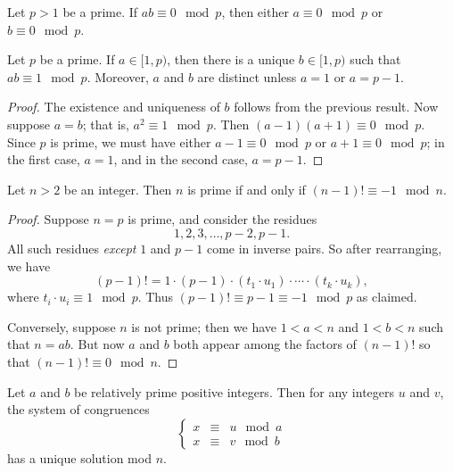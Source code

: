 \begin{cor}
Let \(p > 1\) be a prime.
If \(ab \equiv 0 \mod p\), then either \(a \equiv 0 \mod p\) or \(b \equiv 0 \mod p\).
\end{cor}

\begin{cor}
Let \(p\) be a prime.
If \(a \in [1,p)\), then there is a unique \(b \in [1,p)\) such that \(ab \equiv 1 \mod p\).
Moreover, \(a\) and \(b\) are distinct unless \(a = 1\) or \(a = p-1\).
\end{cor}

\begin{proof}
The existence and uniqueness of \(b\) follows from the previous result.
Now suppose \(a = b\); that is, \(a^2 \equiv 1 \mod p\).
Then \((a-1)(a+1) \equiv 0 \mod p\).
Since \(p\) is prime, we must have either \(a-1 \equiv 0 \mod p\) or \(a+1 \equiv 0 \mod p\); in the first case, \(a = 1\), and in the second case, \(a = p-1\).
\end{proof}

\begin{cor}
Let \(n > 2\) be an integer.
Then \(n\) is prime if and only if \((n-1)! \equiv -1 \mod n\).
\end{cor}

\begin{proof}
Suppose \(n = p\) is prime, and consider the residues \[ 1, 2, 3, \ldots, p-2, p-1. \]
All such residues \emph{except} \(1\) and \(p-1\) come in inverse pairs.
So after rearranging, we have \[ (p-1)! = 1 \cdot (p-1) \cdot (t_1 \cdot u_1) \cdot \cdots \cdot (t_k \cdot u_k), \] where \(t_i \cdot u_i \equiv 1 \mod p\).
Thus \((p-1)! \equiv p-1 \equiv -1 \mod p\) as claimed.

Conversely, suppose \(n\) is not prime; then we have \(1 < a < n\) and \(1 < b < n\) such that \(n = ab\).
But now \(a\) and \(b\) both appear among the factors of \((n-1)!\) so that \((n-1)! \equiv 0 \mod n\).
\end{proof}

\begin{prop}
Let \(a\) and \(b\) be relatively prime positive integers.
Then for any integers \(u\) and \(v\), the system of congruences \[ \left\{ \begin{array}{rcl} x & \equiv & u \mod a \\ x & \equiv & v \mod b \end{array} \right. \] has a unique solution mod \(n\).
\end{prop}

